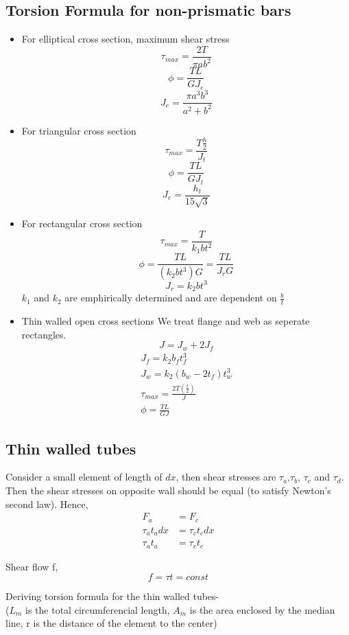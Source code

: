 \documentclass{article}
\begin{document}
	\subsection{Torsion Formula for non-prismatic bars}
	\begin{itemize}
	\item For elliptical cross section, maximum shear stress
		\[\tau_{max} = \frac{2T}{\pi ab^2}\]
		\[\phi = \frac{TL}{GJ_e}\]
		\[J_e = \frac{\pi a^3 b^3}{a^2 + b^2}\]


	\item For triangular cross section
		\[\tau_{max} = \frac{T \frac{h}{2}}{J_t}\]
		\[\phi = \frac{TL}{GJ_t}\]
		\[J_e = \frac{h_t}{15\sqrt{3}}\]

	\item For rectangular cross section
		\[\tau_{max} = \frac{T}{k_1 b t^2}\]
		\[\phi = \frac{TL}{(k_2bt^3)G}= \frac{TL}{J_rG}\]
		\[J_r = k_2 b t^3\]
		$k_1$ and $k_2$ are emphirically determined and are dependent on $\frac{b}{t}$

	\item Thin walled open cross sections
	We treat flange and web as seperate rectangles.
		\[J = J_w + 2J_f\]
		\begin{gather*}
		J_f = k_2 b_f t_f^3 \\
		J_w = k_2 (b_w-2t_f) t_w^3\\
		\tau_{max} = \frac{2T (\frac{t}{2})}{J}\\
		\phi = \frac{TL}{GJ}
		\end{gather*}
	\end{itemize}

	\subsection{Thin walled tubes}
		Consider a small element of length of $dx$, then shear stresses are $\tau_a$,$\tau_b$, $\tau_c$ and $\tau_d$. Then the shear stresses on opposite wall should be equal (to satisfy Newton's second law). Hence,
		\begin{align*}
			F_a &= F_c\\
			\tau_a t_a dx &= \tau_c t_c dx\\
			\tau_a t_a &= \tau_c t_c
		\end{align*}

		Shear flow f,
		\[\boxed{f = \tau t = const}\]

	Deriving torsion formula for the thin walled tubes- \\
	($L_m$ is the total circumferencial length, $A_m$ is the area enclosed by the median line, r is the distance of the element to the center)
\end{document}
